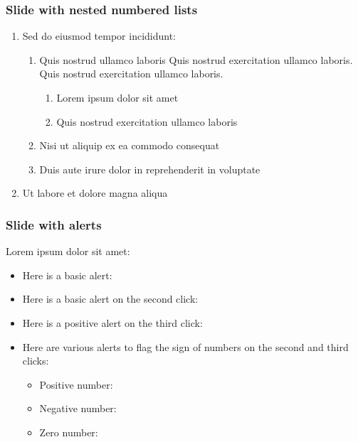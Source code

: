 \documentclass[11pt, xcolor={dvipsnames}, usepdftitle=false]{beamer}
\begin{document}
\begin{frame}
\frametitle{Slide with nested numbered lists}
\begin{enumerate}
\item Sed do eiusmod tempor incididunt:
\begin{enumerate}
\item Quis nostrud ullamco laboris Quis nostrud exercitation ullamco laboris. Quis nostrud exercitation ullamco laboris. 
\begin{enumerate}
\item Lorem ipsum dolor sit amet
\item Quis nostrud exercitation ullamco laboris
\end{enumerate}
\item Nisi ut aliquip ex ea commodo consequat
\item Duis aute irure dolor in reprehenderit in voluptate
\end{enumerate}
\item Ut labore et dolore magna aliqua
\end{enumerate}
\end{frame}

\begin{frame}
\frametitle{Slide with alerts}
Lorem ipsum dolor sit amet:
\begin{itemize}
\item Here is a basic alert: 
\item Here is a basic alert on the second click: 
\item Here is a positive alert on the third click: 
\item Here are various alerts to flag the sign of numbers on the second and third clicks:
\begin{itemize}
\item Positive number: 
\item Negative number: 
\item Zero number: 
\end{itemize}
\end{itemize}
\end{frame}

\begin{frame}
\end{frame}
\end{document}
